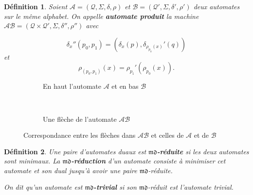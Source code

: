\documentclass[11pt,a4paper]{article}
\newtheorem{definition}{Définition}
\begin{document}
\begin{definition}
  \label{def:produit}
  Soient $\mathcal{A} = \left(\mathcal{Q}, \Sigma, \delta, \rho\right)$ et $\mathcal{B} = \left(\mathcal{Q'}, \Sigma, \delta', \rho'\right)$ deux automates sur le même alphabet. On appelle \textbf{\textit{automate produit}} la machine $\mathcal{AB} = \left(\mathcal{Q}\times\mathcal{Q'}, \Sigma, \delta'', \rho''\right)$ avec

\[ \delta_x''(p_0, p_1) = (\delta_x(p), \delta_{\rho_{p_0}(x)}'(q))\]
et
\[ \rho_{(p_0,p_1)}(x) = \rho_{p_1}'(\rho_{p_0}(x)). \]
\end{definition}

\begin{figure}[h!]
  \begin{subfigure}[b]{0.5\textwidth}
    \centering
    \caption{En haut l'automate $\mathcal{A}$ et en bas $\mathcal{B}$}
  \end{subfigure}
  ~
  \begin{subfigure}[b]{0.5\textwidth}
    \centering
    \caption{Une flèche de l'automate $\mathcal{AB}$}
  \end{subfigure}
  \caption{Correspondance entre les flèches dans $\mathcal{AB}$ et celles de $\mathcal{A}$ et de $\mathcal{B}$}
\end{figure}

\begin{definition}{\cite{DBLP:journals/corr/abs-1105-4725}}
  \label{def:md-red}
  Une paire d'automates duaux est \textbf{$\mathfrak{md}$-réduite} si les deux automates sont minimaux. La \textbf{$\mathfrak{md}$-réduction} d'un automate consiste à minimiser cet automate et son dual jusqu'à avoir une paire $\mathfrak{md}$-réduite.

  On dit qu'un automate est \textbf{$\mathfrak{md}$-trivial} si son $\mathfrak{md}$-réduit est l'automate trivial.
\end{definition}
\end{document}

